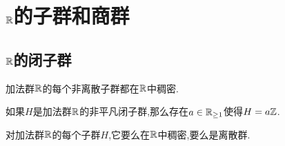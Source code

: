 \chapter{\texorpdfstring{$\mathbb{R}$}{R}的子群和商群}

\section{\texorpdfstring{$\mathbb{R}$}{R}的闭子群}

\begin{lemma}{}{}
	加法群$\mathbb{R}$的每个非离散子群都在$\mathbb{R}$中稠密.
\end{lemma}

\begin{proposition}{}{}
	如果$H$是加法群$\mathbb{R}$的非平凡闭子群,那么存在$a\in\mathbb{R}_{\geq 1}$使得$H=a\mathbb{Z}$.
\end{proposition}

\begin{corollary}{}{}
	对加法群$\mathbb{R}$的每个子群$H$,它要么在$\mathbb{R}$中稠密,要么是离散群.
\end{corollary}